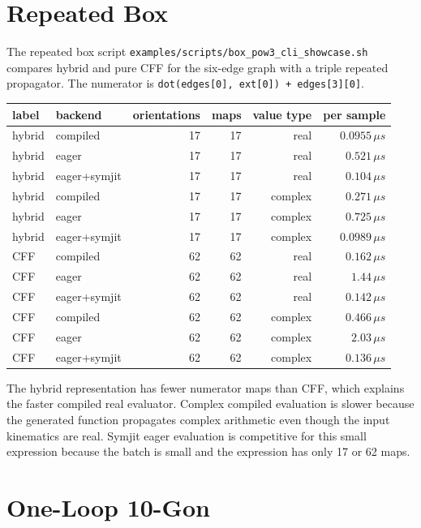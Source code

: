 \documentclass[11pt,a4paper]{report}
\begin{document}
\section{Repeated Box}

The repeated box script
\texttt{examples/scripts/box\_pow3\_cli\_showcase.sh} compares hybrid and pure
CFF for the six-edge graph with a triple repeated propagator.  The numerator is
\texttt{dot(edges[0], ext[0]) + edges[3][0]}.

\begin{center}
\begin{tabular}{llrrrr}
\toprule
label & backend & orientations & maps & value type & per sample \\
\midrule
hybrid & compiled & 17 & 17 & real & \(0.0955\,\mu s\) \\
hybrid & eager & 17 & 17 & real & \(0.521\,\mu s\) \\
hybrid & eager+symjit & 17 & 17 & real & \(0.104\,\mu s\) \\
hybrid & compiled & 17 & 17 & complex & \(0.271\,\mu s\) \\
hybrid & eager & 17 & 17 & complex & \(0.725\,\mu s\) \\
hybrid & eager+symjit & 17 & 17 & complex & \(0.0989\,\mu s\) \\
CFF & compiled & 62 & 62 & real & \(0.162\,\mu s\) \\
CFF & eager & 62 & 62 & real & \(1.44\,\mu s\) \\
CFF & eager+symjit & 62 & 62 & real & \(0.142\,\mu s\) \\
CFF & compiled & 62 & 62 & complex & \(0.466\,\mu s\) \\
CFF & eager & 62 & 62 & complex & \(2.03\,\mu s\) \\
CFF & eager+symjit & 62 & 62 & complex & \(0.136\,\mu s\) \\
\bottomrule
\end{tabular}
\end{center}

The hybrid representation has fewer numerator maps than CFF, which explains
the faster compiled real evaluator.  Complex compiled evaluation is slower
because the generated function propagates complex arithmetic even though the
input kinematics are real.  Symjit eager evaluation is competitive for this
small expression because the batch is small and the expression has only 17 or
62 maps.

\section{One-Loop 10-Gon}
\end{document}
